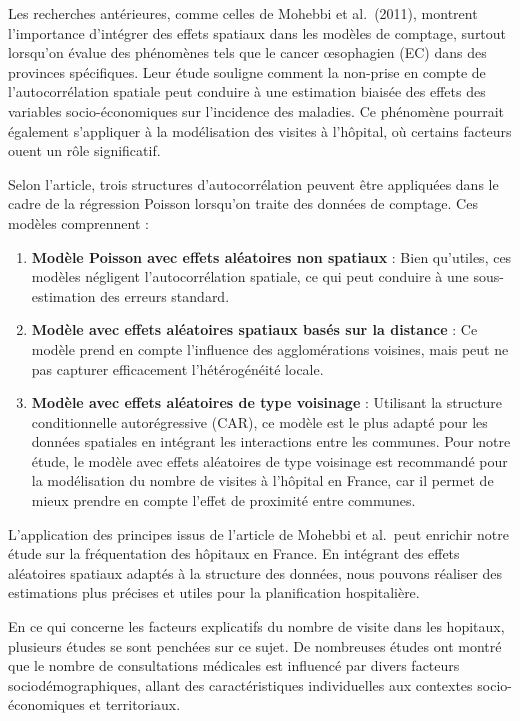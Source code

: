 \documentclass[
]{article}
\begin{document}
Les recherches antérieures, comme celles de Mohebbi et al.~(2011),
montrent l'importance d'intégrer des effets spatiaux dans les modèles de
comptage, surtout lorsqu'on évalue des phénomènes tels que le cancer
œsophagien (EC) dans des provinces spécifiques. Leur étude souligne
comment la non-prise en compte de l'autocorrélation spatiale peut
conduire à une estimation biaisée des effets des variables
socio-économiques sur l'incidence des maladies. Ce phénomène pourrait
également s'appliquer à la modélisation des visites à l'hôpital, où
certains facteurs ouent un rôle significatif.

Selon l'article, trois structures d'autocorrélation peuvent être
appliquées dans le cadre de la régression Poisson lorsqu'on traite des
données de comptage. Ces modèles comprennent :

\begin{enumerate}
\def\labelenumi{\arabic{enumi}.}
\item
  \textbf{Modèle Poisson avec effets aléatoires non spatiaux} : Bien
  qu'utiles, ces modèles négligent l'autocorrélation spatiale, ce qui
  peut conduire à une sous-estimation des erreurs standard.
\item
  \textbf{Modèle avec effets aléatoires spatiaux basés sur la distance}
  : Ce modèle prend en compte l'influence des agglomérations voisines,
  mais peut ne pas capturer efficacement l'hétérogénéité locale.
\item
  \textbf{Modèle avec effets aléatoires de type voisinage} : Utilisant
  la structure conditionnelle autorégressive (CAR), ce modèle est le
  plus adapté pour les données spatiales en intégrant les interactions
  entre les communes. Pour notre étude, le modèle avec effets aléatoires
  de type voisinage est recommandé pour la modélisation du nombre de
  visites à l'hôpital en France, car il permet de mieux prendre en
  compte l'effet de proximité entre communes.
\end{enumerate}

L'application des principes issus de l'article de Mohebbi et al.~peut
enrichir notre étude sur la fréquentation des hôpitaux en France. En
intégrant des effets aléatoires spatiaux adaptés à la structure des
données, nous pouvons réaliser des estimations plus précises et utiles
pour la planification hospitalière.

En ce qui concerne les facteurs explicatifs du nombre de visite dans les
hopitaux, plusieurs études se sont penchées sur ce sujet. De nombreuses
études ont montré que le nombre de consultations médicales est influencé
par divers facteurs sociodémographiques, allant des caractéristiques
individuelles aux contextes socio-économiques et territoriaux.
\end{document}
